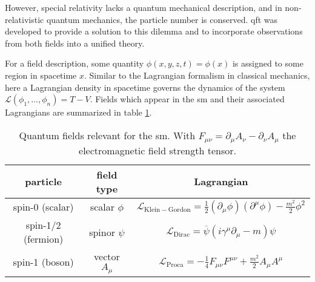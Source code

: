 However, special relativity lacks a quantum mechanical description, and in non-relativistic quantum mechanics, the particle number is conserved. \ac{qft} was developed to provide a solution to this dilemma and to incorporate observations from both fields into a unified theory.

For a field description, some quantity $\phi(x,y,z,t)=\phi(x)$ is assigned to some region in spacetime $x$. Similar to the Lagrangian formalism in classical mechanics, here a Lagrangian density in spacetime governs the dynamics of the system $\mathcal{L}(\phi_1,\dots,\phi_n) =T-V$. Fields which appear in the \ac{sm} and their associated Lagrangians are summarized in table \ref{tab:fields}.
{\renewcommand{\arraystretch}{1.7} %
\begin{table}
    \begin{center}
        \begin{tabular}{c|c|c}
            particle           & field type      & Lagrangian                                                                                                   \\ \hline
            spin-0 (scalar)    & scalar $\phi$   & $\mathcal{L}_\mathrm{Klein-Gordon}=\frac{1}{2} (\partial_\mu \phi )(\partial^\mu \phi)-\frac{m^2}{2}\phi^2 $ \\
            spin-1/2 (fermion) & spinor $\psi$   & $\mathcal{L}_\mathrm{Dirac}= \overline{\psi}(i \gamma^\mu \partial_\mu - m )\psi$                            \\
            spin-1 (boson)     & vector  $A_\mu$ & $\mathcal{L}_\mathrm{Proca}= -\frac{1}{4}F_{\mu\nu}F^{\mu\nu} +\frac{m^2}{2} A_\mu A^\mu$                    \\ [.7ex]
        \end{tabular}
        \caption{Quantum fields relevant for the \ac{sm}. With $F_{\mu\nu}=\partial_\mu A_\nu - \partial_\nu A_\mu$ the electromagnetic field strength tensor.}
        \label{tab:fields}
    \end{center}
\end{table}
}

